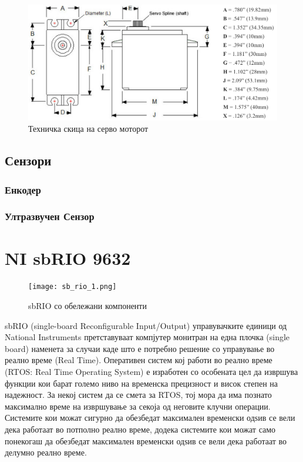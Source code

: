 \documentclass{article}
\begin{document}
\begin{figure}[H]
\includegraphics[width=0.75\linewidth]{servo_schematic.png}
\centering
\caption{Техничка скица на серво моторот}
\label{fig:servo_schematic.png}
\end{figure}

\subsection{Сензори}
\subsubsection{Енкодер}
\subsubsection{Ултразвучен Сензор}
\newpage
\section{NI sbRIO 9632}

\begin{figure}[h]
\centering
\texttt{[image: sb\_rio\_1.png]}
\caption{sbRIO со обележани компоненти}
\label{fig:sb_rio_1.png}

\end{figure}
sbRIO (single-board Reconfigurable Input/Output) управувачките единици од National Instruments претставуваат компјутер монитран на една плочка (single board) наменета за случаи каде што е потребно решение со управување во реално време (Real Time). Оперативен систем кој работи во реално време (RTOS: Real Time Operating System) е изработен со особената цел да извршува функции кои барат големо ниво на временска прецизност и висок степен на надежност. За некој систем да се смета за RTOS, тој мора да има познато максимално време на извршување за секоја од неговите клучни операции. Системите кои можат сигурно да обезбедат максимален временски одѕив се вели дека работаат во потполно реално време, додека системите кои можат само понекогаш да обезбедат максимален временски одѕив се вели дека работаат во делумно реално време.  
 
\end{document}
